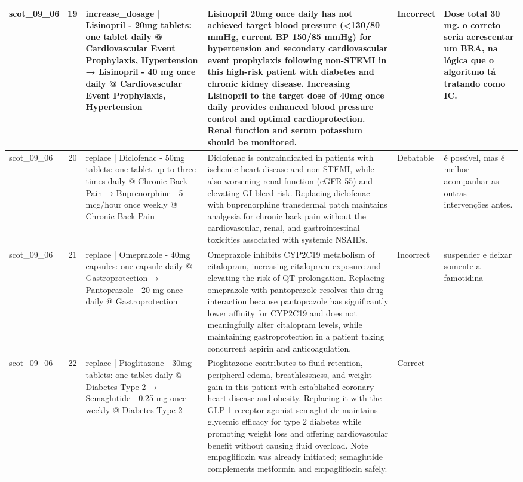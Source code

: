 \begin{longtable}{|p{1.45cm}|c|p{3.3cm}|p{6.5cm}|p{1.55cm}|p{2.3cm}|}
\hline
scot\_09\_06 & 19 & increase\_dosage | Lisinopril - 20mg tablets: one tablet daily @ Cardiovascular Event Prophylaxis, Hypertension → Lisinopril - 40 mg once daily @ Cardiovascular Event Prophylaxis, Hypertension & Lisinopril 20mg once daily has not achieved target blood pressure (<130/80 mmHg, current BP 150/85 mmHg) for hypertension and secondary cardiovascular event prophylaxis following non-STEMI in this high-risk patient with diabetes and chronic kidney disease. Increasing Lisinopril to the target dose of 40mg once daily provides enhanced blood pressure control and optimal cardioprotection. Renal function and serum potassium should be monitored. & Incorrect & Dose total 30 mg. o correto seria acrescentar um BRA, na lógica que o algoritmo tá tratando como IC. \\
\hline
scot\_09\_06 & 20 & replace | Diclofenac - 50mg tablets: one tablet up to three times daily @ Chronic Back Pain → Buprenorphine - 5 mcg/hour once weekly @ Chronic Back Pain & Diclofenac is contraindicated in patients with ischemic heart disease and non-STEMI, while also worsening renal function (eGFR 55) and elevating GI bleed risk. Replacing diclofenac with buprenorphine transdermal patch maintains analgesia for chronic back pain without the cardiovascular, renal, and gastrointestinal toxicities associated with systemic NSAIDs. & Debatable & é possível, mas é melhor acompanhar as outras intervenções antes. \\
\hline
scot\_09\_06 & 21 & replace | Omeprazole - 40mg capsules: one capsule daily @ Gastroprotection → Pantoprazole - 20 mg once daily @ Gastroprotection & Omeprazole inhibits CYP2C19 metabolism of citalopram, increasing citalopram exposure and elevating the risk of QT prolongation. Replacing omeprazole with pantoprazole resolves this drug interaction because pantoprazole has significantly lower affinity for CYP2C19 and does not meaningfully alter citalopram levels, while maintaining gastroprotection in a patient taking concurrent aspirin and anticoagulation. & Incorrect & suspender e deixar somente a famotidina \\
\hline
scot\_09\_06 & 22 & replace | Pioglitazone - 30mg tablets: one tablet daily @ Diabetes Type 2 → Semaglutide - 0.25 mg once weekly @ Diabetes Type 2 & Pioglitazone contributes to fluid retention, peripheral edema, breathlessness, and weight gain in this patient with established coronary heart disease and obesity. Replacing it with the GLP-1 receptor agonist semaglutide maintains glycemic efficacy for type 2 diabetes while promoting weight loss and offering cardiovascular benefit without causing fluid overload. Note empagliflozin was already initiated; semaglutide complements metformin and empagliflozin safely. & Correct &  \\

\end{longtable}
